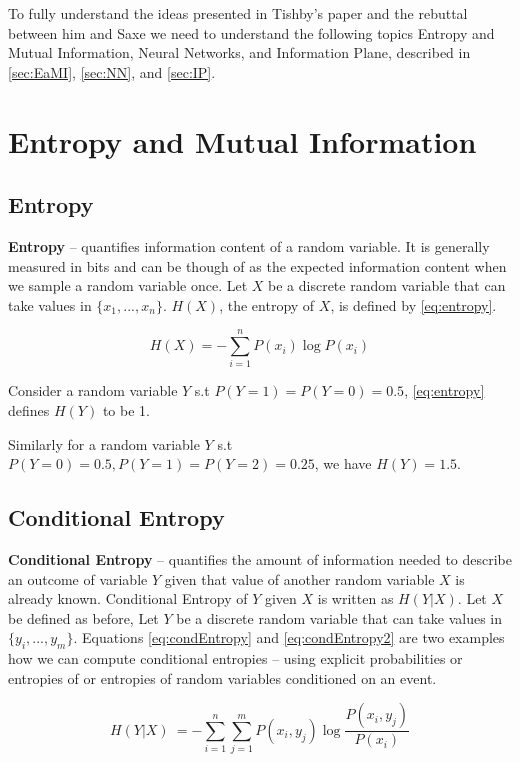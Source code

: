 \documentclass[dissertation.tex]{subfiles}
\begin{document}
To fully understand the ideas presented in Tishby's paper and the
rebuttal\cite{DISCUSSION} between him and Saxe we need to understand the
following topics Entropy and Mutual Information, Neural Networks, and
Information Plane, described in \autoref{sec:EaMI}, \autoref{sec:NN}, and
\autoref{sec:IP}.

\section{Entropy and Mutual Information}
\label{sec:EaMI}

\subsection{Entropy}
\textbf{Entropy} -- quantifies information content of a random variable. It is
generally measured in bits and can be though of as the expected information
content when we sample a random variable once. Let $X$ be a discrete random
variable that can take values in $\{x_1,...,x_n\}$. $H(X)$, the entropy of
$X$, is defined by \autoref{eq:entropy}.

\begin{equation}
  H(X)=-\sum _{i=1}^{n}{P (x_i)\log P(x_i)}
\label{eq:entropy}
\end{equation}

Consider a random variable $Y$ s.t $P(Y=1) = P(Y=0) = 0.5$, \autoref{eq:entropy}
defines $H(Y)$ to be 1.

Similarly for a random variable $Y$ s.t $P(Y=0) = 0.5, P(Y=1) = P(Y=2) = 0.25$,
we have $H(Y) = 1.5$.

\subsection{Conditional Entropy}
\textbf{Conditional Entropy} -- quantifies the amount of information needed to
describe an outcome of variable $Y$ given that value of another random variable
$X$ is already known. Conditional Entropy of $Y$ given $X$ is written as
$H(Y|X)$. Let $X$ be defined as before, Let $Y$ be a discrete random variable
that can take values in $\{y_i,...,y_m\}$. Equations \ref{eq:condEntropy} and
\ref{eq:condEntropy2} are two examples how we can compute conditional entropies
-- using explicit probabilities or entropies of or entropies of random variables
conditioned on an event.

\begin{equation}
H(Y|X)\ =-\sum _{i=1}^n\sum _{j=1}^mP(x_i,y_j)\log {\frac {P(x_i,y_j)}{P(x_i)}}
\label{eq:condEntropy}
\end{equation}
\end{document}
